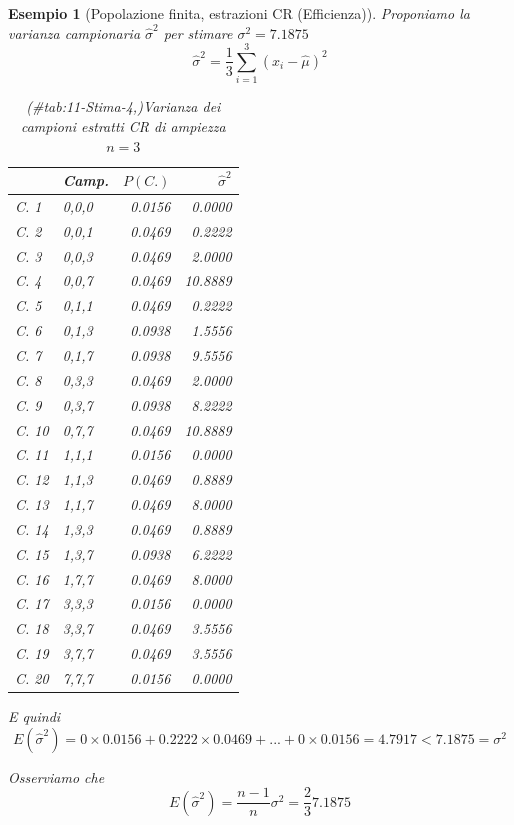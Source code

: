 \documentclass[
  11pt,
]{book}
\theoremstyle{mytheoremstyle}
\theoremstyle{mydefstyle}
\newtheorem{example}{{Esempio}}[section]
\begin{document}
\begin{example}[Popolazione finita, estrazioni CR (Efficienza)]
Proponiamo la varianza campionaria \(\hat\sigma^2\) per stimare \(\sigma^2=7.1875\)
\[\hat\sigma^2=\frac 1 3\sum_{i=1}^3(x_i-\hat \mu)^2\]

\begin{table}
\centering
\caption{(\#tab:11-Stima-4,)Varianza dei campioni estratti CR di ampiezza $n=3$}
\centering
\fontsize{8}{10}\selectfont
\begin{tabular}[t]{llrr}
\toprule
  & Camp. & $P(C.)$ & $\hat\sigma^2$\\
\midrule
C. 1 & 0,0,0 & 0.0156 & 0.0000\\
C. 2 & 0,0,1 & 0.0469 & 0.2222\\
C. 3 & 0,0,3 & 0.0469 & 2.0000\\
C. 4 & 0,0,7 & 0.0469 & 10.8889\\
C. 5 & 0,1,1 & 0.0469 & 0.2222\\
\addlinespace
C. 6 & 0,1,3 & 0.0938 & 1.5556\\
C. 7 & 0,1,7 & 0.0938 & 9.5556\\
C. 8 & 0,3,3 & 0.0469 & 2.0000\\
C. 9 & 0,3,7 & 0.0938 & 8.2222\\
C. 10 & 0,7,7 & 0.0469 & 10.8889\\
\addlinespace
C. 11 & 1,1,1 & 0.0156 & 0.0000\\
C. 12 & 1,1,3 & 0.0469 & 0.8889\\
C. 13 & 1,1,7 & 0.0469 & 8.0000\\
C. 14 & 1,3,3 & 0.0469 & 0.8889\\
C. 15 & 1,3,7 & 0.0938 & 6.2222\\
\addlinespace
C. 16 & 1,7,7 & 0.0469 & 8.0000\\
C. 17 & 3,3,3 & 0.0156 & 0.0000\\
C. 18 & 3,3,7 & 0.0469 & 3.5556\\
C. 19 & 3,7,7 & 0.0469 & 3.5556\\
C. 20 & 7,7,7 & 0.0156 & 0.0000\\
\bottomrule
\end{tabular}
\end{table}

E quindi
\[
  E(\hat\sigma^2)  = 0\times0.0156+0.2222\times0.0469+...+0\times0.0156 = 4.7917<
  7.1875=\sigma^2
\]

Osserviamo che
\[
E(\hat\sigma^2)=\frac{n-1}n\sigma^2=\frac{2}{3}7.1875
\]
\end{example}
\end{document}

